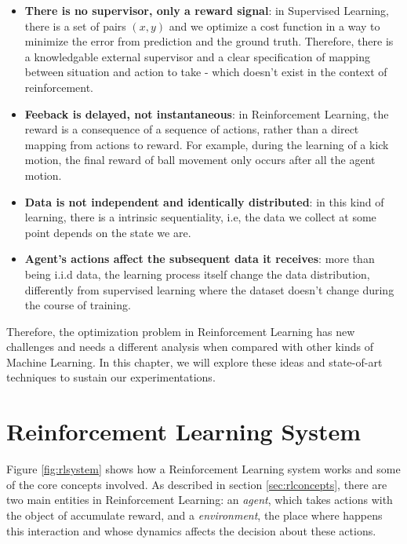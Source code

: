 \begin{itemize}
	\item \textbf{There is no supervisor, only a reward signal}: in Supervised Learning, there is a set of pairs $(x, y)$ and we optimize a cost function in a way to minimize the error from prediction and the ground truth. Therefore, there is a knowledgable external supervisor and a clear specification of mapping between situation and action to take - which doesn't exist in the context of reinforcement.
	
	\item \textbf{Feeback is delayed, not instantaneous}: in Reinforcement Learning, the reward is a consequence of a sequence of actions, rather than a direct mapping from actions to reward. For example, during the learning of a kick motion, the final reward of ball movement only occurs after all the agent motion.
	
	\item \textbf{Data is not independent and identically distributed}: in this kind of learning, there is a intrinsic sequentiality, i.e, the data we collect at some point depends on the state we are.
	
	\item \textbf{Agent's actions affect the subsequent data it receives}: more than being i.i.d data, the learning process itself change the data distribution, differently from supervised learning where the dataset doesn't change during the course of training.
\end{itemize}


Therefore, the optimization problem in Reinforcement Learning has new challenges and needs a different analysis when compared with other kinds of Machine Learning. In this chapter, we will explore these ideas and state-of-art techniques to sustain our experimentations.

\section{Reinforcement Learning System}\label{sec:rlsystem}

Figure \ref{fig:rlsystem} shows how a Reinforcement Learning system works and some of the core concepts involved. As described in section \ref{sec:rlconcepts}, there are two main entities in Reinforcement Learning: an \textit{agent}, which takes actions with the object of accumulate reward, and a \textit{environment}, the place where happens this interaction and whose dynamics affects the decision about these actions.

